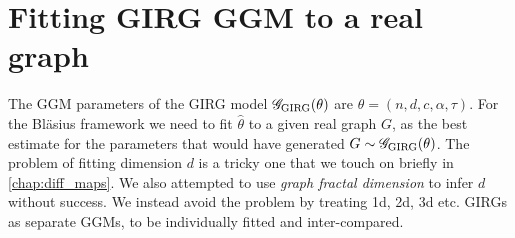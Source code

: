 









\section{Fitting GIRG GGM to a real graph}
The GGM parameters of the GIRG model $\mathscr{G}_{\mathrm{GIRG}}(\theta)$ are $\theta = (n, d, c, \alpha, \tau)$. For the Bl{\"a}sius framework we need to fit $\hat{\theta}$ to a given real graph $G$, as the best estimate for the parameters that would have generated $G \sim \mathscr{G}_{\mathrm{GIRG}}(\theta)$. The problem of fitting dimension $d$ is a tricky one that we touch on briefly in \cref{chap:diff_maps}. We also attempted to use \textit{graph fractal dimension} to infer $d$ without success. We instead avoid the problem by treating 1d, 2d, 3d etc. GIRGs as separate GGMs, to be individually fitted and inter-compared.

